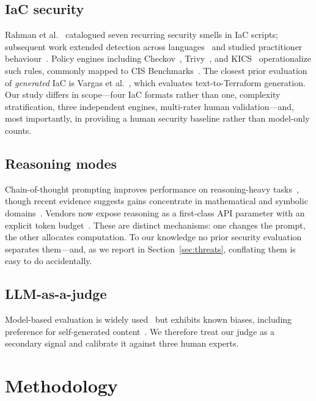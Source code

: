 \documentclass[conference]{IEEEtran}
\begin{document}
\subsection{IaC security}
Rahman et al.~\cite{rahman2019seven} catalogued seven recurring security smells
in IaC scripts; subsequent work extended detection across
languages~\cite{saavedra2023glitch} and studied practitioner
behaviour~\cite{verdet2023exploring,rahman2019systematic}. Policy engines
including Checkov~\cite{checkov}, Trivy~\cite{trivy}, and KICS~\cite{kics}
operationalize such rules, commonly mapped to CIS
Benchmarks~\cite{cis_benchmarks}. The closest prior evaluation of
\emph{generated} IaC is Vargas et al.~\cite{vargas2026securityfirst}, which
evaluates text-to-Terraform generation. Our study differs in scope---four IaC
formats rather than one, complexity stratification, three independent engines,
multi-rater human validation---and, most importantly, in providing a human
security baseline rather than model-only counts.

\subsection{Reasoning modes}
Chain-of-thought prompting improves performance on reasoning-heavy
tasks~\cite{wei2022chain,kojima2022large}, though recent evidence suggests gains
concentrate in mathematical and symbolic domains~\cite{sprague2025cot}. Vendors
now expose reasoning as a first-class API parameter with an explicit token
budget~\cite{openai2024o1,deepseek2025r1,anthropic2025thinking}. These are
distinct mechanisms: one changes the prompt, the other allocates computation.
To our knowledge no prior security evaluation separates them---and, as we report
in Section~\ref{sec:threats}, conflating them is easy to do accidentally.

\subsection{LLM-as-a-judge}
Model-based evaluation is widely used~\cite{zheng2023judging,gu2025survey} but
exhibits known biases, including preference for self-generated
content~\cite{panickssery2024llm}. We therefore treat our judge as a secondary
signal and calibrate it against three human experts.

\section{Methodology}
\end{document}
